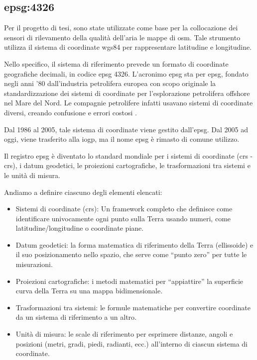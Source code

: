 \subsection{\acrshort{epsg}:4326}

Per il progetto di tesi, sono state utilizzate come base per la collocazione dei sensori di rilevamento
della qualità dell'aria le mappe di \acrfull{osm}. Tale strumento utilizza il sistema di coordinate \acrfull{wgs84}
per rappresentare latitudine e longitudine.

Nello specifico, il sistema di riferimento prevede un formato di coordinate geografiche decimali,
in codice \acrshort{epsg} 4326. L'acronimo \acrshort{epsg} sta per \acrlong{epsg}, fondato negli anni '80
dall'industria petrolifera europea con scopo originale la standardizzazione dei sistemi di coordinate
per l'esplorazione petrolifera offshore nel Mare del Nord. Le compagnie petrolifere infatti usavano
sistemi di coordinate diversi, creando confusione e errori costosi \cite{iogp2019, ashkenazi1984}.

Dal 1986 al 2005, tale sistema di coordinate viene gestito dall'\acrlong{epsg}. Dal 2005 ad oggi, viene trasferito alla
\acrfull{iogp}, ma il nome \acrshort{epsg} è rimasto di comune utilizzo.

Il registro \acrshort{epsg} è diventato lo standard mondiale per i sistemi di coordinate
(\acrlong{crs} - \acrshort{crs}), i datum geodetici, le proiezioni cartografiche, le trasformazioni tra sistemi e
le unità di misura.

Andiamo a definire ciascuno degli elementi elencati:

\begin{itemize}
  \item Sistemi di coordinate (\acrshort{crs}): Un framework completo che definisce come identificare univocamente
        ogni punto sulla Terra usando numeri, come latitudine/longitudine o coordinate piane.
  \item Datum geodetici: la forma matematica di riferimento della Terra (ellissoide) e
        il suo posizionamento nello spazio, che serve come ``punto zero'' per tutte le misurazioni.
  \item Proiezioni cartografiche: i metodi matematici per ``appiattire'' la superficie curva della Terra
        su una mappa bidimensionale.
  \item Trasformazioni tra sistemi: le formule matematiche per convertire coordinate da un sistema di riferimento
        a un altro.
  \item Unità di misura: le scale di riferimento per esprimere distanze, angoli e posizioni
        (metri, gradi, piedi, radianti, ecc.) all'interno di ciascun sistema di coordinate.
\end{itemize}

